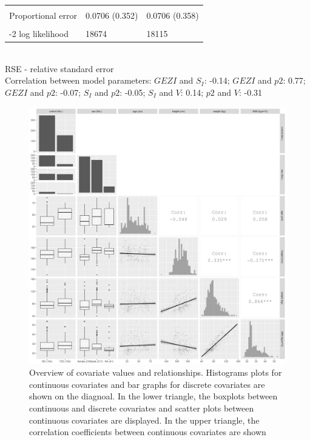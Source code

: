 \documentclass[utf8]{frontiersSCNS} %
\begin{document}
\begin{table}[h]
\begin{tabular}{lll}
                              &               &               \\
Proportional error  & 0.0706 (0.352)                            & 0.0706 (0.358) \\                        \\
-2 log likelihood             & 18674       & 18115       \\ \hline
\end{tabular}\\

RSE - relative standard error\\
Correlation between model parameters: $GEZI$ and $S_I$: -0.14; $GEZI$ and $p2$: 0.77; $GEZI$ and $p2$: -0.07; $S_I$ and $p2$: -0.05; $S_I$ and $V$: 0.14; $p2$ and $V$: -0.31
\end{table}

\begin{figure}[h!]
\begin{center}
\includegraphics[width=15cm]{fig1.PNG}
\end{center}
\caption{Overview of covariate values and relationships. Histograms plots for continuous covariates and bar graphs for discrete covariates are shown on the diagnoal. In the lower triangle, the boxplots between continuous and discrete covariates and scatter plots between continuous covariates are displayed. In the upper triangle, the correlation coefficients between continuous covariates are shown}
\label{fig: cova}
\end{figure}
\end{document}
